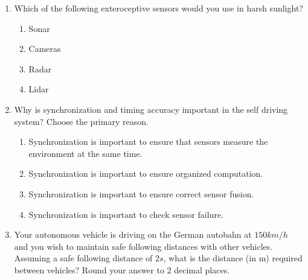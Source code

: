 \begin{enumerate}
\item Which of the following exteroceptive sensors would you use in harsh sunlight?
	\begin{enumerate}
		\item Sonar
		\item Cameras
		\item Radar
		\item Lidar
	\end{enumerate}
\item Why is synchronization and timing accuracy important in the self driving system? Choose the primary reason.
	\begin{enumerate}
		\item Synchronization is important to ensure that sensors measure the environment at the same time.
		\item Synchronization is important to ensure organized computation.
		\item Synchronization is important to ensure correct sensor fusion.
		\item Synchronization is important to check sensor failure.
	\end{enumerate}
\item Your autonomous vehicle is driving on the German autobahn at $150km/h$ and you wish to maintain safe following distances with other vehicles. 
		Assuming a safe following distance of $2s$,  what is the distance (in m) required between vehicles? Round your answer to 2 decimal places.
		

\end{enumerate}
